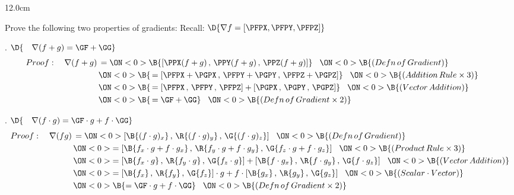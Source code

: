\begin{frame}
\begin{columns}\begin{column}{12.0cm}

\vspace{0.1cm}

\scriptsize

Prove the following two properties of gradients: \qquad Recall:  $\D{\nabla f = \left[\PFPX,\PFPY,\PFPZ \right]}$

. $\D{\quad \nabla(f+g) = \GF + \GG}$
\begin{align*}
Proof: \quad \nabla(f+g)
&\,=
\ON<0>{\B{ \left[\PPX(f+g)\,,\,\PPY(f+g)\,,\,\PPZ(f+g)\right] }} \hspace{0.3cm} 
\ON<0>{\B{(Defn \, of \, Gradient)}} \hspace{1.9cm}\\
&\,
\ON<0>{\B{\, = \left[\PFPX+\PGPX\,,\,\PFPY+\PGPY\,,\,\PFPZ+\PGPZ\right]}} \hspace{0.3cm} 
\ON<0>{\B{(Addition \, Rule \times3)}} \\
&\,
\ON<0>{\B{\, = \left[\PFPX\,,\,\PFPY\,,\,\PFPZ\right] + \left[\PGPX\,,\,\PGPY\,,\,\PGPZ\right]}} \hspace{0.3cm} 
\ON<0>{\B{(Vector \, Addition)}}\\
&\,
\ON<0>{\B{\, = \GF + \GG}} \hspace{0.3cm} 
\ON<0>{\B{(Defn \, of \, Gradient \times 2)}}
\end{align*}

\vspace{0.4cm}

. $\D{\quad \nabla(f \cdot g) = \GF \cdot g + f \cdot \GG}$
\begin{align*}
Proof: \quad \nabla(fg)
&\,=
\ON<0>{\left[\B{(f \cdot g)_x}\,,\,\R{(f \cdot g)_y}\,,\,\G{(f \cdot g)_z}\right] }\hspace{0.3cm} 
\ON<0>{\B{(Defn \, of \, Gradient)}} \hspace{3.1cm}\\
&\,
\ON<0>{= \left[\B{f_x \cdot g + f  \cdot g_x}\,,\,\R{f_y \cdot g + f \cdot g_y}\,,\,\G{f_z \cdot g + f \cdot g_z}\right]}\hspace{0.3cm} 
\ON<0>{\B{(Product \, Rule \times3)}}\\
&\,
\ON<0>{= \left[\B{f_x \cdot g}\,,\,\R{f_y\cdot g}\,,\,\G{f_z\cdot g}\right] + \left[\B{f \cdot g_x}\,,\,\R{f \cdot g_y}\,,\,\G{f \cdot g_z}\right]} \hspace{0.3cm} 
\ON<0>{\B{(Vector \, Addition)}}\\
&\,
\ON<0>{= \left[\B{f_x} \,,\,\R{f_y}\,,\,\G{f_z}\right] \cdot g + f \cdot \left[\B{g_x}\,,\,\R{g_y}\,,\,\G{g_z}\right]} \hspace{0.3cm} 
\ON<0>{\B{(Scalar \cdot Vector)}}\\
&\,
\ON<0>{\B{= \GF \cdot g + f \cdot \GG}} \hspace{0.3cm} 
\ON<0>{\B{(Defn \, of \, Gradient \times 2)}}
\\
\end{align*}


\end{column}
\end{columns}
\end{frame}
